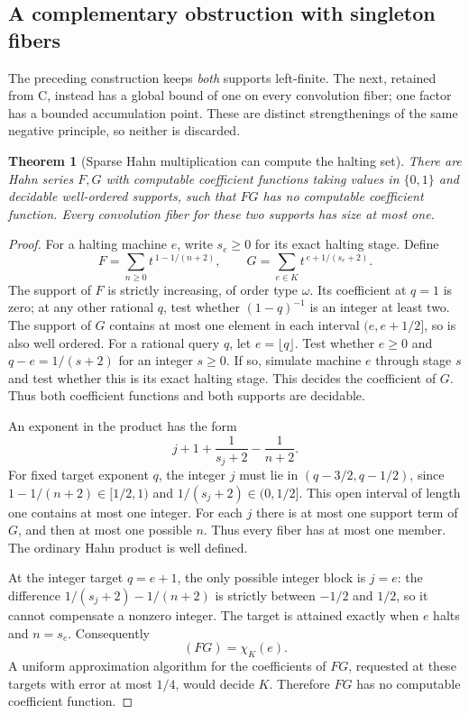 \documentclass[11pt,letterpaper]{article}
\numberwithin{equation}{section}
\newtheorem{theorem}{Theorem}[section]
\theoremstyle{definition}
\theoremstyle{remark}
\begin{document}
\subsection{A complementary obstruction with singleton fibers}
The preceding construction keeps \emph{both} supports left-finite. The next,
retained from C, instead has a global bound of one on every convolution
fiber; one factor has a bounded accumulation point. These are distinct
strengthenings of the same negative principle, so neither is discarded.
\begin{theorem}[Sparse Hahn multiplication can compute the halting set]
\label{thm:singlefiber}
There are Hahn series $F,G$ with computable coefficient functions taking values in $\{0,1\}$ and
decidable well-ordered supports, such that $FG$ has no computable coefficient function. Every convolution
fiber for these two supports has size at most one.
\end{theorem}
\begin{proof}
For a halting machine $e$, write $s_e\geq0$ for its exact halting stage.
Define
\begin{equation}
 F=\sum_{n\geq0}t^{\,1-1/(n+2)},\qquad
 G=\sum_{e\in K}t^{\,e+1/(s_e+2)}.
 \label{C-eq:hahn-FG}
\end{equation}
The support of $F$ is strictly increasing, of order type $\omega$.
Its coefficient at $q=1$ is zero; at any other rational $q$, test whether
$(1-q)^{-1}$ is an integer at least two. The support of $G$ contains at most
one element in each interval $(e,e+1/2]$, so is also well ordered.
For a rational query $q$, let $e=\lfloor q\rfloor$. Test whether $e\geq0$
and $q-e=1/(s+2)$ for an integer $s\geq0$. If so, simulate machine $e$
through stage $s$ and test whether this is its exact halting stage.
This decides the coefficient of $G$. Thus both coefficient functions and
both supports are decidable.

An exponent in the product has the form
\[
 j+1+\frac1{s_j+2}-\frac1{n+2}.
\]
For fixed target exponent $q$, the integer $j$ must lie in
$(q-3/2,q-1/2)$, since $1-1/(n+2)\in[1/2,1)$ and
$1/(s_j+2)\in(0,1/2]$. This open interval of length one contains at most one integer. For each $j$ there is at most one support
term of $G$, and then at most one possible $n$. Thus every fiber has at
most one member. The ordinary Hahn product is well defined.

At the integer target $q=e+1$, the only possible integer block is $j=e$:
the difference $1/(s_j+2)-1/(n+2)$ is strictly between $-1/2$ and $1/2$,
so it cannot compensate a nonzero integer. The target is attained exactly
when $e$ halts and $n=s_e$. Consequently
\begin{equation}
 [t^{e+1}](FG)=\chi_K(e).
 \label{C-eq:product-halting}
\end{equation}
A uniform approximation algorithm for the coefficients of $FG$, requested
at these targets with error at most $1/4$, would decide $K$.
Therefore $FG$ has no computable coefficient function.
\end{proof}
\end{document}
